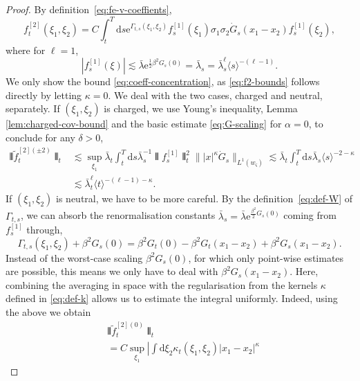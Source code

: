 \documentclass[11pt, a4paper]{scrartcl}
\numberwithin{equation}{section}
\theoremstyle{plain}
\theoremstyle{remark}
\newcommand{\mathd}{\mathrm{d}}
\newcommand{\mathe}{\mathrm{e}}
\begin{document}
\begin{proof}
	By definition~\eqref{eq:fe-v-coeffients},
	\[ f^{[2]}_t (\xi_1, \xi_2) = C \int_t^T \mathd s \mathe^{\Gamma_{t, s} (\xi_1,
			\xi_2)} f^{[1]}_s (\xi_1) \sigma_1 \sigma_2  \dot{G}_s (x_1 - x_2)
		f^{[1]}_s (\xi_2), \]
	where for $\ell = 1$,
	\begin{equation}
		| f^{[1]}_s (\xi) | \lesssim \bar{\lambda} \mathe^{\frac{1}{2} \beta^2 G_s (0)}
		= \bar{\lambda}_s = \bar{\lambda}_s^{\ell} \langle s \rangle^{- (\ell - 1)} .
		\label{eq:v1}
	\end{equation}
	We only show the bound \eqref{eq:coeff-concentration}, as
	\eqref{eq:f2-bounds} follows directly by letting $\kappa = 0$. We deal with
	the two cases, charged and neutral, separately. If $(\xi_1, \xi_2)$ is
	charged, we use Young's inequality, Lemma \ref{lem:charged-cov-bound} and
	the basic estimate \eqref{eq:G-scaling} for $\alpha = 0$, to conclude for
	any $\delta > 0$,
	\begin{align*}
		\interleave \tilde{f}_t^{[2] (\pm 2)} \interleave_t
		 & \lesssim \sup_{\xi_1}
		\bar{\lambda}_t  \int_t^T \mathd s \bar{\lambda}_s^{- 1} \interleave f_s^{[1]}
		\interleave_t^2  \| | x |^{\kappa}  \dot{G}_s \|_{L^1 (w_{\varsigma})}
		\lesssim \bar{\lambda}_t  \int_t^T \mathd s \bar{\lambda}_s \langle s \rangle^{- 2 -
		\kappa}                                                              \\
		 & \lesssim \bar{\lambda}_t^{\ell} \langle t \rangle^{- (\ell - 1) -
			\kappa} .
	\end{align*}
	If $(\xi_1, \xi_2)$ is neutral, we have to be more careful. By the
	definition~\eqref{eq:def-W} of $\Gamma_{t, s}$, we can absorb the renormalisation
	constants $\bar{\lambda}_s = \bar{\lambda} \mathe^{\frac{\beta^2}{2} G_s (0)}$ coming
	from $f^{[1]}_s$ through,
	\[ \Gamma_{t, s} (\xi_1, \xi_2) + \beta^2 G_s (0) = \beta^2 G_t (0) - \beta^2 G_t
		(x_1 - x_2) + \beta^2 G_s (x_1 - x_2) . \]
	Instead of the worst-case scaling $\beta^2 G_s (0)$, for which only
	point-wise estimates are possible, this means we only have to deal with
	$\beta^2 G_s (x_1 - x_2)$. Here, combining the averaging in space with the
	regularisation from the kernels $\kappa$ defined in \eqref{eq:def-k} allows
	us to estimate the integral uniformly. Indeed, using the above we obtain
		{\footnotesize\begin{align*}
				 & \interleave \tilde{f}_t^{[2] (0)} \interleave_t                    \\
				 & =  C \sup_{\xi_1}
				\left| \int \mathd \xi_2 \kappa_t (\xi_1, \xi_2) | x_1 - x_2 |^{\kappa}

\end{align*}}
\end{proof}
\end{document}
